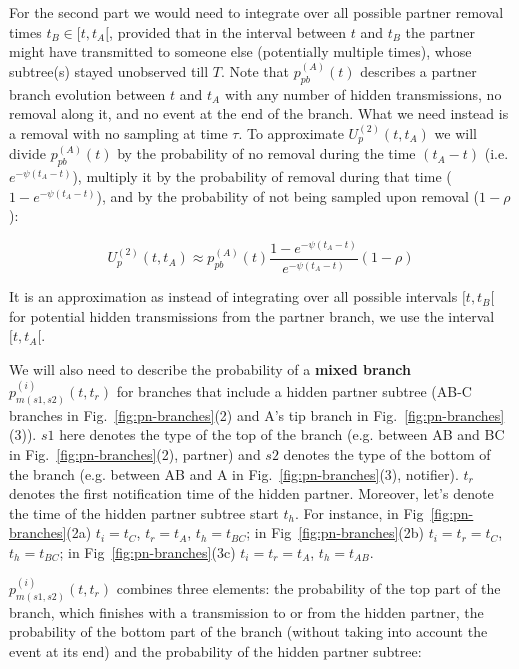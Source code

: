 \documentclass[a4paper,10pt]{article}
\begin{document}
For the second part we would need to integrate over all possible partner removal times $t_B \in [t, t_A[$, provided that in the interval between $t$ and $t_B$ the partner might have transmitted to someone else (potentially multiple times), whose subtree(s) stayed unobserved till $T$. Note that $p_{pb}^{(A)}(t)$ describes a partner branch evolution between $t$ and $t_A$ with any number of hidden transmissions, no removal along it, and no event at the end of the branch. What we need instead is a removal with no sampling at time $\tau$. To approximate $U_p^{(2)}(t, t_A)$ we will divide $p_{pb}^{(A)}(t)$ by the probability of no removal during the time $(t_A - t)$ (i.e. $e^{-\psi(t_A - t)}$), multiply it by the probability of removal during that time ($1 - e^{-\psi(t_A - t)}$), and by the probability of not being sampled upon removal ($1 - \rho$):

\begin{equation}
U_p^{(2)}(t, t_A) \approx p_{pb}^{(A)}(t) \frac{1 - e^{-\psi(t_A - t)}}{e^{-\psi(t_A - t)}} (1 - \rho)
\end{equation}

It is an approximation as instead of integrating over all possible intervals $[t, t_B[$ for potential hidden transmissions from the partner branch, we use the interval $[t, t_A[$.
 

We will also need to describe the probability of a\textbf{ mixed branch} $p_{m(s1,s2)}^{(i)}(t,t_r)$ for branches that include a hidden partner subtree (AB-C branches in Fig.~\ref{fig:pn-branches}(2) and A's tip branch in Fig.~\ref{fig:pn-branches}(3)). $s1$ here denotes the type of the top of the branch (e.g. between AB and BC in Fig.~\ref{fig:pn-branches}(2), partner) and $s2$ denotes the type of the bottom of the branch (e.g. between AB and A in Fig.~\ref{fig:pn-branches}(3), notifier). $t_r$ denotes the first notification time of the hidden partner. Moreover, let's denote the time of the hidden partner subtree start $t_h$.  For instance, in Fig~\ref{fig:pn-branches}(2a) $t_i=t_C$, $t_r=t_A$, $t_h=t_{BC}$; in Fig~\ref{fig:pn-branches}(2b) $t_i=t_r=t_C$, $t_h=t_{BC}$; in Fig~\ref{fig:pn-branches}(3c) $t_i=t_r=t_A$, $t_h=t_{AB}$. 

$p_{m(s1,s2)}^{(i)}(t,t_r)$ combines three elements: the probability of the top part of the branch, which finishes with a transmission to or from the hidden partner, the probability of the bottom part of the branch (without taking into account the event at its end) and the probability of the hidden partner subtree:
\end{document}
